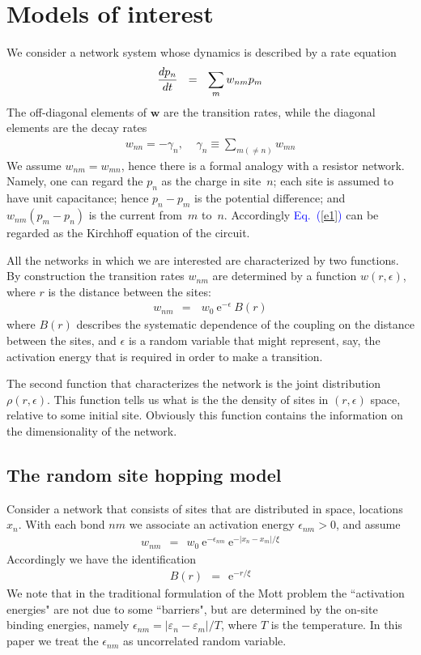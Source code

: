 \documentclass[onecolumn,fleqn,12pt,openany,draft]{book}
\newcommand{\eexp}{\mbox{e}^}
\newcommand{\mylabel}[1]{\label{#1}}
\newcommand{\beq}{\begin{eqnarray}}
\newcommand{\eeq}{\end{eqnarray}}
\newcommand{\be}[1]{\begin{eqnarray}\ifthenelse{#1=-1}
{\nonumber}{\ifthenelse{#1=0}{}{\mylabel{e#1}}}}
\newcommand{\Eq}[1]{\textcolor{blue}{Eq.\!\!~(\ref{#1})}}
\begin{document}
\section{Models of interest}

We consider a network system whose dynamics 
is described by a rate equation
%
\be{1}
\frac{dp_n}{dt} \ \ =  \ \ \sum_m w_{nm} p_m
\eeq
%
The off-diagonal elements of $\bm{w}$ 
are the transition rates, while the diagonal 
elements are the decay rates 
%
\beq
w_{nn} =-\gamma_n, 
\ \ \ \ \  \gamma_n\equiv \sum_{m (\neq n)} w_{mn}  
\eeq
%
We assume $w_{nm}=w_{mn}$, hence there is a formal analogy 
with a resistor network. Namely, one can regard the $p_n$ 
as the charge in site~$n$; each site is assumed to have 
unit capacitance; hence $p_n{-}p_m$ is the potential 
difference; and $w_{nm}(p_m{-}p_n)$ is the current 
from~$m$ to~$n$. Accordingly \Eq{e1} can be regarded
as the Kirchhoff equation of the circuit.


All the networks in which we are interested are characterized 
by two functions. By construction the transition rates $w_{nm}$ 
are determined by a function $w(r,\epsilon)$, 
where $r$ is the distance between the sites: 
%
\beq
w_{nm} \ \ = \ \  \ w_0 \ \eexp{-\epsilon} \ B(r) 
\eeq
%
where $B(r)$ describes the systematic dependence 
of the coupling on the distance between the sites, 
and $\epsilon$ is a random variable that might  
represent, say, the activation energy that is required 
in order to make a transition. 

The second function that characterizes the network 
is the joint distribution $\rho(r,\epsilon)$.  
This function tells us what is the the density 
of sites in $(r,\epsilon)$ space, relative to some initial site. 
Obviously this function contains the information 
on the dimensionality of the network. 


\subsection{The random site hopping model}

Consider a network that consists of sites 
that are distributed in space, locations $x_n$.
With each bond $nm$ we associate an activation 
energy $\epsilon_{nm}>0$, and assume   
%
\beq
w_{nm} \ \ = \ \  w_0 \ \eexp{-\epsilon_{nm}} \ \eexp{-|x_n-x_m|/\xi} 
\eeq
%
Accordingly we have the identification 
%
\beq
B(r) \ \ = \ \ \eexp{-r/\xi} 
\eeq
%
We note that in the traditional formulation 
of the Mott problem the ``activation energies"
are not due to some ``barriers", 
but are determined by the on-site binding energies, 
namely $\epsilon_{nm}=|\varepsilon_n-\varepsilon_m|/T$,   
where $T$ is the temperature.
In this paper we treat the $\epsilon_{nm}$ 
as uncorrelated random variable.
\end{document}
